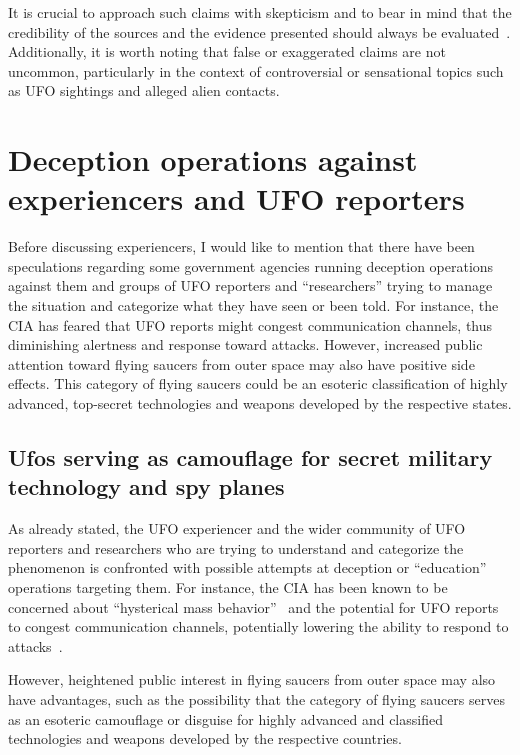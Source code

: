 It is crucial to approach such claims with skepticism and to bear in mind that the credibility of the sources and the evidence presented should always be evaluated~\cite{Appelle1995,Appelle2000}. Additionally, it is worth noting that false or exaggerated claims are not uncommon, particularly in the context of controversial or sensational topics such as UFO sightings and alleged alien contacts.



\section{Deception operations against experiencers and UFO reporters}
\label{2023-UFO-part-Perception-abductions-do}

Before discussing experiencers, I would like to mention that there have been speculations regarding some government agencies running deception operations against them and groups of UFO reporters and ``researchers'' trying to manage the situation and categorize what they have seen or been told. For instance, the CIA has feared that UFO reports might congest communication channels, thus diminishing alertness and response toward attacks. However, increased public attention toward flying saucers from outer space may also have positive side effects. This category of flying saucers could be an esoteric classification of highly advanced, top-secret technologies and weapons developed by the respective states.


\subsection{Ufos serving as camouflage for secret military technology and spy planes}

As already stated, the UFO experiencer
and the wider community of UFO reporters and researchers who are trying to understand and categorize the phenomenon
is confronted with possible attempts at deception or ``education'' operations targeting them.
For instance, the CIA has been known to be concerned about ``hysterical mass behavior''~\cite[Chapter~4]{Jacobsen2011} and the potential for UFO reports to congest communication channels,
potentially lowering the ability to respond to attacks~\cite{Haines-CIA-UFO}.

However, heightened public interest in flying saucers from outer space may also have advantages,
such as the possibility that the category of flying saucers serves as an esoteric camouflage or disguise for
highly advanced and classified technologies and weapons developed by the respective countries.

